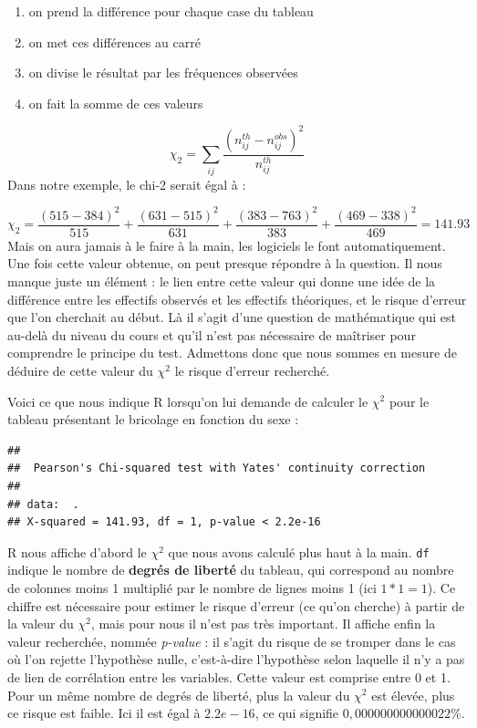 \documentclass[
]{book}
\newenvironment{Shaded}{\begin{snugshade}}{\end{snugshade}}
\newcommand{\FunctionTok}[1]{\textcolor[rgb]{0.00,0.00,0.00}{#1}}
\newcommand{\NormalTok}[1]{#1}
\newcommand{\SpecialCharTok}[1]{\textcolor[rgb]{0.00,0.00,0.00}{#1}}
\providecommand{\tightlist}{%
  \setlength{\itemsep}{0pt}\setlength{\parskip}{0pt}}
\begin{document}
\begin{enumerate}
\def\labelenumi{\arabic{enumi}.}
\tightlist
\item
  on prend la différence pour chaque case du tableau
\item
  on met ces différences au carré
\item
  on divise le résultat par les fréquences observées
\item
  on fait la somme de ces valeurs
\end{enumerate}

\[\chi_2 = \sum_{ij} \frac{(n^{th}_{ij} - n^{obs}_{ij})^2}{n^{th}_{ij}}\]
Dans notre exemple, le chi-2 serait égal à :

\[ \chi_2 = \frac{(515-384)^2}{515} + \frac{(631-515)^2}{631}+\frac{(383-763)^2}{383} + \frac{(469-338)^2}{469} = 141.93 \]
Mais on aura jamais à le faire à la main, les logiciels le font automatiquement. Une fois cette valeur obtenue, on peut presque répondre à la question. Il nous manque juste un élément : le lien entre cette valeur qui donne une idée de la différence entre les effectifs observés et les effectifs théoriques, et le risque d'erreur que l'on cherchait au début. Là il s'agit d'une question de mathématique qui est au-delà du niveau du cours et qu'il n'est pas nécessaire de maîtriser pour comprendre le principe du test. Admettons donc que nous sommes en mesure de déduire de cette valeur du \(\chi^2\) le risque d'erreur recherché.

Voici ce que nous indique R lorsqu'on lui demande de calculer le \(\chi^2\) pour le tableau présentant le bricolage en fonction du sexe :

\begin{Shaded}
\end{Shaded}

\begin{verbatim}
## 
##  Pearson's Chi-squared test with Yates' continuity correction
## 
## data:  .
## X-squared = 141.93, df = 1, p-value < 2.2e-16
\end{verbatim}

R nous affiche d'abord le \(\chi^2\) que nous avons calculé plus haut à la main. \texttt{df} indique le nombre de \textbf{degrés de liberté} du tableau, qui correspond au nombre de colonnes moins 1 multiplié par le nombre de lignes moins 1 (ici \(1*1=1\)). Ce chiffre est nécessaire pour estimer le risque d'erreur (ce qu'on cherche) à partir de la valeur du \(\chi^2\), mais pour nous il n'est pas très important. Il affiche enfin la valeur recherchée, nommée \emph{p-value} : il s'agit du risque de se tromper dans le cas où l'on rejette l'hypothèse nulle, c'est-à-dire l'hypothèse selon laquelle il n'y a pas de lien de corrélation entre les variables. Cette valeur est comprise entre 0 et 1. Pour un même nombre de degrés de liberté, plus la valeur du \(\chi^2\) est élevée, plus ce risque est faible. Ici il est égal à \(2.2e-16\), ce qui signifie \(0,000000000000022 \%\).
\end{document}
